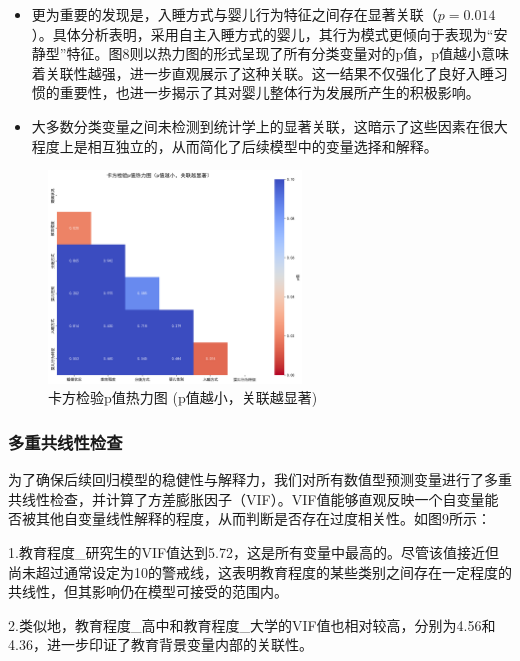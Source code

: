 \documentclass[withoutpreface,bwprint]{cumcmthesis}
\begin{document}
\begin{itemize}
    \item[] %
    更为重要的发现是，入睡方式与婴儿行为特征之间存在显著关联（$p=0.014$）。具体分析表明，采用自主入睡方式的婴儿，其行为模式更倾向于表现为“安静型”特征。图8则以热力图的形式呈现了所有分类变量对的p值，p值越小意味着关联性越强，进一步直观展示了这种关联。这一结果不仅强化了良好入睡习惯的重要性，也进一步揭示了其对婴儿整体行为发展所产生的积极影响。
    \item 大多数分类变量之间未检测到统计学上的显著关联，这暗示了这些因素在很大程度上是相互独立的，从而简化了后续模型中的变量选择和解释。
\end{itemize}

\begin{figure}[htbp]
    \centering
    \includegraphics[width=0.6\textwidth]{figures/chi_square_p_values_heatmap.png}
    \caption{卡方检验p值热力图 (p值越小，关联越显著)}
    \label{fig:chi_square_p_values_heatmap}
\end{figure}

\subsubsection{多重共线性检查}
为了确保后续回归模型的稳健性与解释力，我们对所有数值型预测变量进行了多重共线性检查，并计算了方差膨胀因子（VIF）。VIF值能够直观反映一个自变量能否被其他自变量线性解释的程度，从而判断是否存在过度相关性。如图9所示：

1.教育程度\_研究生的VIF值达到5.72，这是所有变量中最高的。尽管该值接近但尚未超过通常设定为10的警戒线，这表明教育程度的某些类别之间存在一定程度的共线性，但其影响仍在模型可接受的范围内。

2.类似地，教育程度\_高中和教育程度\_大学的VIF值也相对较高，分别为4.56和4.36，进一步印证了教育背景变量内部的关联性。
\end{document}
